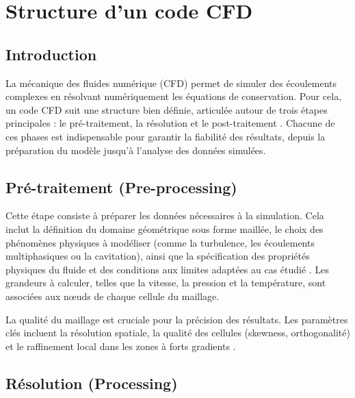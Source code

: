 \chapter{Structure d'un code CFD}
\label{chap:structure_code_cfd}

\section{Introduction}
\label{sec:introduction_structure_cfd}

La mécanique des fluides numérique (CFD) permet de simuler des écoulements complexes en résolvant numériquement les équations de conservation. Pour cela, un code CFD suit une structure bien définie, articulée autour de trois étapes principales : le pré-traitement, la résolution et le post-traitement \cite{wendt2009computational}. Chacune de ces phases est indispensable pour garantir la fiabilité des résultats, depuis la préparation du modèle jusqu'à l'analyse des données simulées.

\section{Pré-traitement (Pre-processing)}
\label{sec:preprocessing}

Cette étape consiste à préparer les données nécessaires à la simulation. Cela inclut la définition du domaine géométrique sous forme maillée, le choix des phénomènes physiques à modéliser (comme la turbulence, les écoulements multiphasiques ou la cavitation), ainsi que la spécification des propriétés physiques du fluide et des conditions aux limites adaptées au cas étudié \cite{thompson1999handbook}. Les grandeurs à calculer, telles que la vitesse, la pression et la température, sont associées aux nœuds de chaque cellule du maillage.

La qualité du maillage est cruciale pour la précision des résultats. Les paramètres clés incluent la résolution spatiale, la qualité des cellules (skewness, orthogonalité) et le raffinement local dans les zones à forts gradients \cite{knupp1993fundamentals}.

\section{Résolution (Processing)}
\label{sec:processing}


